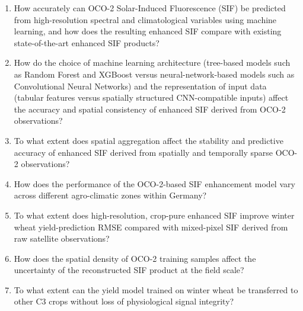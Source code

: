 \begin{enumerate}
    \item[\textbf{RQ1:}] How accurately can OCO-2 Solar-Induced Fluorescence (SIF) be predicted from high-resolution spectral and climatological variables using machine learning, and how does the resulting enhanced SIF compare with existing state-of-the-art enhanced SIF products?

    \item[\textbf{RQ2:}] How do the choice of machine learning architecture (tree-based models such as Random Forest and XGBoost versus neural-network-based models such as Convolutional Neural Networks) and the representation of input data (tabular features versus spatially structured CNN-compatible inputs) affect the accuracy and spatial consistency of enhanced SIF derived from OCO-2 observations?

    \item[\textbf{RQ3:}] To what extent does spatial aggregation affect the stability and predictive accuracy of enhanced SIF derived from spatially and temporally sparse OCO-2 observations?

    \item[\textbf{RQ4:}] How does the performance of the OCO-2-based SIF enhancement model vary across different agro-climatic zones within Germany?

    \item[\textbf{RQ5:}] To what extent does high-resolution, crop-pure enhanced SIF improve winter wheat yield-prediction RMSE compared with mixed-pixel SIF derived from raw satellite observations?

    \item[\textbf{RQ6:}] How does the spatial density of OCO-2 training samples affect the uncertainty of the reconstructed SIF product at the field scale?

    \item[\textbf{RQ7:}] To what extent can the yield model trained on winter wheat be transferred to other C3 crops without loss of physiological signal integrity?
\end{enumerate}
